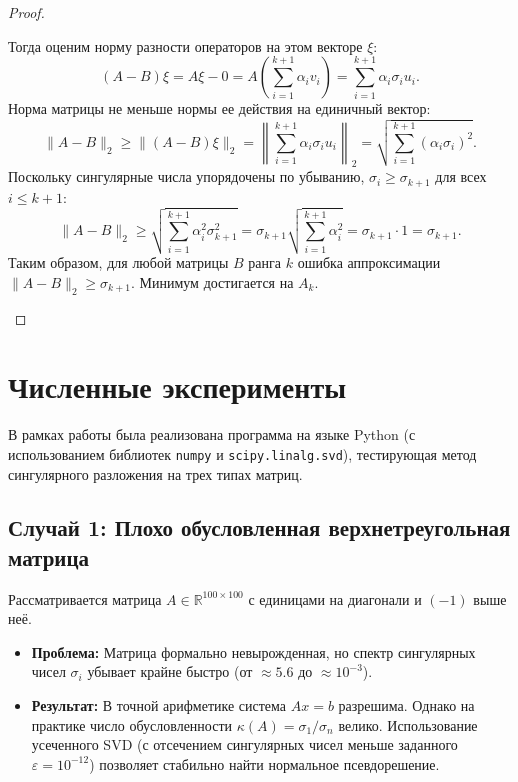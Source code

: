 \documentclass[12pt, a4paper]{article}
\theoremstyle{definition}
\begin{document}
\begin{proof}
\begin{enumerate}
    Тогда оценим норму разности операторов на этом векторе $\xi$:
    \[
    (A - B)\xi = A\xi - 0 = A\left( \sum_{i=1}^{k+1} \alpha_i v_i \right) = \sum_{i=1}^{k+1} \alpha_i \sigma_i u_i.
    \]
    Норма матрицы не меньше нормы ее действия на единичный вектор:
    \[
    \|A - B\|_2 \ge \|(A - B)\xi\|_2 = \left\| \sum_{i=1}^{k+1} \alpha_i \sigma_i u_i \right\|_2 = \sqrt{\sum_{i=1}^{k+1} (\alpha_i \sigma_i)^2}.
    \]
    Поскольку сингулярные числа упорядочены по убыванию, $\sigma_i \ge \sigma_{k+1}$ для всех $i \le k+1$:
    \[
    \|A - B\|_2 \ge \sqrt{\sum_{i=1}^{k+1} \alpha_i^2 \sigma_{k+1}^2} = \sigma_{k+1} \sqrt{\sum_{i=1}^{k+1} \alpha_i^2} = \sigma_{k+1} \cdot 1 = \sigma_{k+1}.
    \]
    Таким образом, для любой матрицы $B$ ранга $k$ ошибка аппроксимации $\|A - B\|_2 \ge \sigma_{k+1}$. Минимум достигается на $A_k$.
\end{enumerate}
\end{proof}

\vspace{0.5cm}

\section{Численные эксперименты}

В рамках работы была реализована программа на языке Python (с использованием библиотек \texttt{numpy} и \texttt{scipy.linalg.svd}), тестирующая метод сингулярного разложения на трех типах матриц.

\subsection{Случай 1: Плохо обусловленная верхнетреугольная матрица}
Рассматривается матрица $A \in \mathbb{R}^{100 \times 100}$ с единицами на диагонали и $(-1)$ выше неё. 
\begin{itemize}
    \item \textbf{Проблема:} Матрица формально невырожденная, но спектр сингулярных чисел $\sigma_i$ убывает крайне быстро (от $\approx 5.6$ до $\approx 10^{-3}$).
    \item \textbf{Результат:} В точной арифметике система $Ax=b$ разрешима. Однако на практике число обусловленности $\kappa(A) = \sigma_1 / \sigma_n$ велико. Использование усеченного SVD (с отсечением сингулярных чисел меньше заданного $\varepsilon=10^{-12}$) позволяет стабильно найти нормальное псевдорешение.
\end{itemize}
\end{document}
